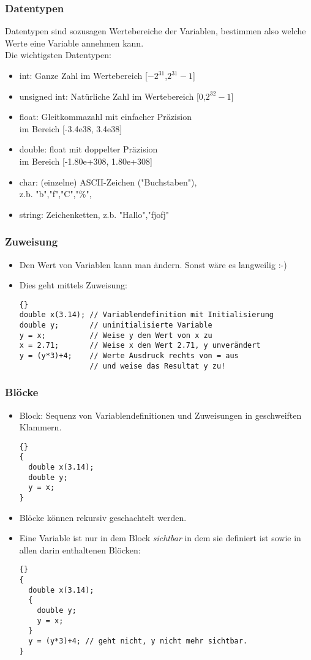 \begin{frame}[fragile]
\frametitle{Datentypen}
Datentypen sind sozusagen Wertebereiche der Variablen, bestimmen also welche Werte eine Variable annehmen kann. \\
Die wichtigsten Datentypen:
\begin{itemize}
\item int: Ganze Zahl im Wertebereich [$-2^{31}$,$2^{31}-1$]
\item unsigned int: Natürliche Zahl im Wertebereich [0,$2^{32}-1$]
\item float: Gleitkommazahl mit einfacher Präzision \\ im Bereich [-3.4e38, 3.4e38]
\item double: float mit doppelter Präzision\\ im Bereich [-1.80e+308, 1.80e+308]
\item char: (einzelne) ASCII-Zeichen ("Buchstaben"), \\ z.b. "b","f","C","\%",
\item string: Zeichenketten, z.b. "Hallo","fjofj"
\end{itemize}
\end{frame}

\begin{frame}[fragile]
\frametitle{Zuweisung}
\begin{itemize}
\item Den Wert von Variablen kann man ändern. Sonst wäre es langweilig
  :-)
\item Dies geht mittels Zuweisung:
{\scriptsize\begin{lstlisting}{}
double x(3.14); // Variablendefinition mit Initialisierung
double y;       // uninitialisierte Variable
y = x;          // Weise y den Wert von x zu
x = 2.71;       // Weise x den Wert 2.71, y unverändert
y = (y*3)+4;    // Werte Ausdruck rechts von = aus
                // und weise das Resultat y zu!
\end{lstlisting}}
\end{itemize}
\end{frame}

\begin{frame}[fragile]
\frametitle{Blöcke}
\begin{itemize}
\item Block: Sequenz von Variablendefinitionen und Zuweisungen in
  geschweiften Klammern.
{\scriptsize\begin{lstlisting}{}
{
  double x(3.14);
  double y;
  y = x;
}
\end{lstlisting}}
\item Blöcke können rekursiv geschachtelt werden.
\item Eine Variable ist nur in dem Block \textsl{sichtbar} in dem sie
  definiert ist sowie in allen darin enthaltenen Blöcken:
{\scriptsize\begin{lstlisting}{}
{
  double x(3.14);
  {
    double y;
    y = x;
  }
  y = (y*3)+4; // geht nicht, y nicht mehr sichtbar.
}
\end{lstlisting}}
\end{itemize}
\end{frame}

